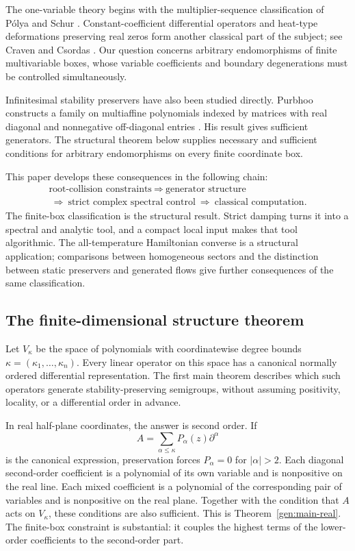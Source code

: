 \documentclass[reqno]{amsart}
\theoremstyle{definition}
\theoremstyle{remark}
\begin{document}
The one-variable theory begins with the multiplier-sequence
classification of P\'olya and Schur \cite{PolyaSchur14}. Constant-coefficient
differential operators and heat-type deformations preserving real zeros
form another classical part of the subject; see Craven and Csordas
\cite{CravenCsordas94}. Our question concerns arbitrary endomorphisms of
finite multivariable boxes, whose variable coefficients and boundary
degenerations must be controlled simultaneously.

Infinitesimal stability preservers have also been studied directly.
Purbhoo constructs a family on multiaffine polynomials indexed by
matrices with real diagonal and nonnegative off-diagonal entries
\cite[Proposition~4.5]{Purbhoo18}. His result gives sufficient
generators. The structural theorem below supplies necessary and
sufficient conditions for arbitrary endomorphisms on every finite
coordinate box.

This paper develops these consequences in the following chain:
\[
 \begin{gathered}
 \text{root-collision constraints}
 \ \Longrightarrow\
 \text{generator structure}\\
 \ \Longrightarrow\
 \text{strict complex spectral control}
 \ \Longrightarrow\
 \text{classical computation}.
 \end{gathered}
\]
The finite-box classification is the structural result. Strict damping
turns it into a spectral and analytic tool, and a compact local input
makes that tool algorithmic. The all-temperature Hamiltonian converse
is a structural application; comparisons between homogeneous sectors
and the distinction between static preservers and generated flows give
further consequences of the same classification.

\subsection{The finite-dimensional structure theorem}

Let $V_\kappa$ be the space of polynomials with coordinatewise degree
bounds $\kappa=(\kappa_1,\ldots,\kappa_n)$. Every linear operator on this
space has a canonical normally ordered differential representation.
The first main theorem describes which such operators generate
stability-preserving semigroups, without assuming positivity, locality,
or a differential order in advance.

In real half-plane coordinates, the answer is second order. If
\[
 A=\sum_{\alpha\leq\kappa}P_\alpha(z)\partial^\alpha
\]
is the canonical expression, preservation forces $P_\alpha=0$ for
$|\alpha|>2$. Each diagonal second-order coefficient is a polynomial
of its own variable and is nonpositive on the real line. Each mixed
coefficient is a polynomial of the corresponding pair of variables and
is nonpositive on the real plane. Together with the condition that
$A$ acts on $V_\kappa$, these conditions are also sufficient.
This is Theorem~\ref{gen:main-real}. The finite-box constraint is
substantial: it couples the highest terms of the lower-order
coefficients to the second-order part.
\end{document}
